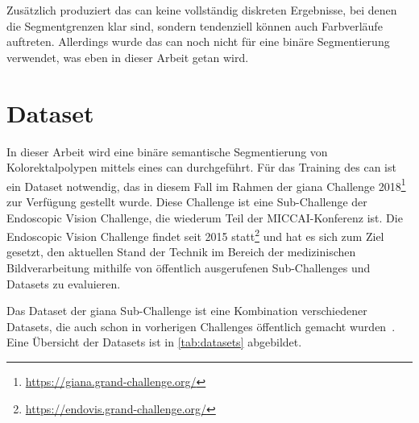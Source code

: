 Zusätzlich produziert das \gls{can} keine vollständig diskreten Ergebnisse, bei denen die Segmentgrenzen klar sind, sondern tendenziell können auch Farbverläufe auftreten.
Allerdings wurde das \gls{can} noch nicht für eine binäre Segmentierung verwendet, was eben in dieser Arbeit getan wird.



\section{Dataset}

In dieser Arbeit wird eine binäre semantische Segmentierung von Kolorektalpolypen mittels eines \gls{can} durchgeführt.
Für das Training des \gls{can} ist ein Dataset notwendig, das in diesem Fall im Rahmen der \gls{giana} Challenge 2018\footnote{\url{https://giana.grand-challenge.org/}} zur Verfügung gestellt wurde.
Diese Challenge ist eine Sub-Challenge der Endoscopic Vision Challenge, die wiederum Teil der MICCAI-Konferenz ist.
Die Endoscopic Vision Challenge findet seit 2015 statt\footnote{\url{https://endovis.grand-challenge.org/}} und hat es sich zum Ziel gesetzt, den aktuellen Stand der Technik im Bereich der medizinischen Bildverarbeitung mithilfe von öffentlich ausgerufenen Sub-Challenges und Datasets zu evaluieren.

Das Dataset der \gls{giana} Sub-Challenge ist eine Kombination verschiedener Datasets, die auch schon in vorherigen Challenges öffentlich gemacht wurden~\cite{Bernal.2012,Bernal.2015,Vazquez.2017}.
Eine Übersicht der Datasets ist in \autoref{tab:datasets} abgebildet.


